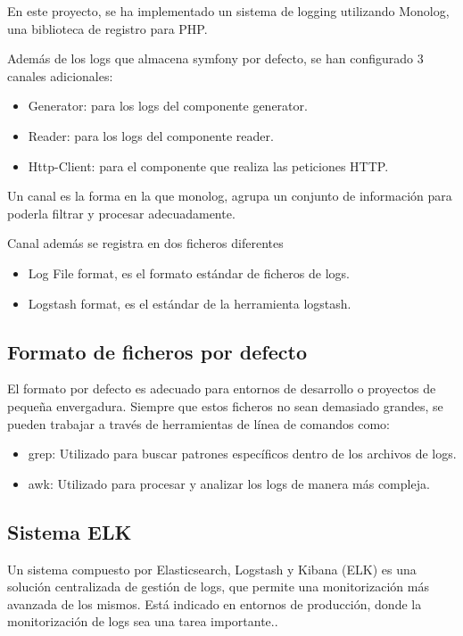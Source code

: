 En este proyecto, se ha implementado un sistema de logging utilizando Monolog, una biblioteca de registro para PHP.

Además de los logs que almacena symfony por defecto, se han configurado 3 canales adicionales:

\begin{itemize}
    \item Generator: para los logs del componente generator.
    \item Reader: para los logs del componente reader.
    \item Http-Client: para el componente que realiza las peticiones HTTP.
\end{itemize}

Un canal es la forma en la que monolog, agrupa un conjunto de información para poderla filtrar y procesar adecuadamente.

Canal además se registra en dos ficheros diferentes

\begin{itemize}
    \item Log File format, es el formato estándar de ficheros de logs.
    \item Logstash format, es el estándar de la herramienta logstash.
\end{itemize}

\subsection*{Formato de ficheros por defecto}
El formato por defecto es adecuado para entornos de desarrollo o proyectos de pequeña envergadura. Siempre que estos
ficheros no sean demasiado grandes, se pueden trabajar a través de herramientas de línea de comandos como:

\begin{itemize}
    \item grep: Utilizado para buscar patrones específicos dentro de los archivos de logs.
    \item awk: Utilizado para procesar y analizar los logs de manera más compleja.
\end{itemize}

\subsection*{Sistema ELK}
Un sistema compuesto por Elasticsearch, Logstash y Kibana (ELK) es una solución centralizada de gestión de logs, que
permite una monitorización más avanzada de los mismos. Está indicado en entornos de producción, donde la monitorización
de logs sea una tarea importante..


